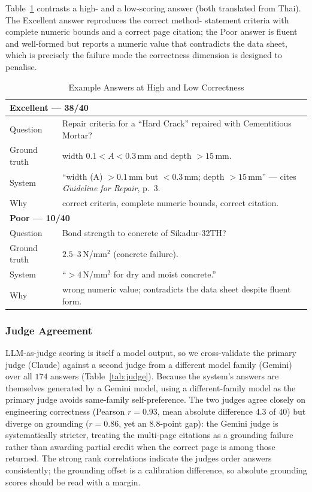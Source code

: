 \documentclass[10pt,a4paper,conference]{IEEEtran}
\begin{document}
Table~\ref{tab:examples} contrasts a high- and a low-scoring answer (both
translated from Thai). The Excellent answer reproduces the correct method-
statement criteria with complete numeric bounds and a correct page citation;
the Poor answer is fluent and well-formed but reports a numeric value that
contradicts the data sheet, which is precisely the failure mode the correctness
dimension is designed to penalise.

\begin{table}[htbp]
\caption{Example Answers at High and Low Correctness}
\begin{center}
\footnotesize
\begin{tabular}{|p{}|p{}|}
\hline
\multicolumn{2}{|l|}{\textbf{Excellent --- 38/40}} \\
\hline
Question & Repair criteria for a ``Hard Crack'' repaired with Cementitious Mortar? \\
\hline
Ground truth & width $0.1 < A < 0.3$\,mm and depth $> 15$\,mm. \\
\hline
System & ``width (A) $> 0.1$\,mm but $< 0.3$\,mm; depth $> 15$\,mm'' --- cites \emph{Guideline for Repair}, p.~3. \\
\hline
Why & correct criteria, complete numeric bounds, correct citation. \\
\hline
\multicolumn{2}{|l|}{\textbf{Poor --- 10/40}} \\
\hline
Question & Bond strength to concrete of Sikadur-32TH? \\
\hline
Ground truth & $2.5$--$3$\,N/mm$^2$ (concrete failure). \\
\hline
System & ``$> 4$\,N/mm$^2$ for dry and moist concrete.'' \\
\hline
Why & wrong numeric value; contradicts the data sheet despite fluent form. \\
\hline
\end{tabular}
\label{tab:examples}
\end{center}
\end{table}

\subsubsection{Judge Agreement}
\label{ssec:judge}
LLM-as-judge scoring is itself a model output, so we cross-validate the primary
judge (Claude) against a second judge from a different model family (Gemini) over
all $174$ answers (Table~\ref{tab:judge}). Because the system's answers are
themselves generated by a Gemini model, using a different-family model as the
primary judge avoids same-family self-preference. The two judges agree closely on
engineering correctness (Pearson $r=0.93$, mean absolute difference $4.3$ of
$40$) but diverge on grounding ($r=0.86$, yet an $8.8$-point gap): the Gemini
judge is systematically stricter, treating the multi-page citations as a
grounding failure rather than awarding partial credit when the correct page is
among those returned. The
strong rank correlations indicate the judges order answers consistently; the
grounding offset is a calibration difference, so absolute grounding scores
should be read with a margin.
\end{document}
